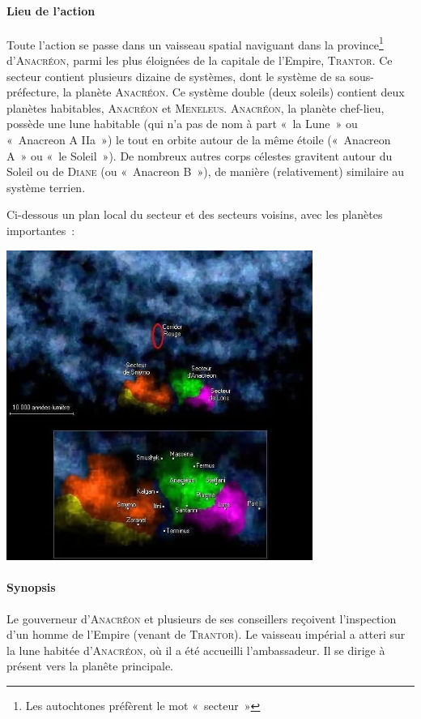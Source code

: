\paragraph{Lieu de l’action}
{
Toute l’action se passe dans un vaisseau spatial naviguant dans la province\footnote{Les autochtones préfèrent le mot «~secteur~»} d’\textsc{Anacréon}, parmi les plus éloignées de la capitale de l’Empire, \textsc{Trantor}.
Ce secteur contient plusieurs dizaine de systèmes, dont le système de sa sous-préfecture, la planète \textsc{Anacréon}.
Ce système double (deux soleils) contient deux planètes habitables, \textsc{Anacréon} et \textsc{Meneleus}.  \textsc{Anacréon}, la planète chef-lieu, possède une lune habitable (qui n’a pas de nom à part «~la Lune~» ou «~Anacreon A IIa~») le tout en orbite autour de la même étoile («~Anacreon A~» ou «~le Soleil~»).
De nombreux autres corps célestes gravitent autour du Soleil ou de \textsc{Diane} (ou «~Anacreon B~»), de manière (relativement) similaire au système terrien.

Ci-dessous un plan local du secteur et des secteurs voisins, avec les planètes importantes~:
\begin{center}
	\includegraphics[width=10cm]{galactographie.png}
\end{center}
}

\paragraph{Synopsis}
{
Le gouverneur d’\textsc{Anacréon} et plusieurs de ses conseillers reçoivent l’inspection d’un homme de l’Empire (venant de \textsc{Trantor}).
Le vaisseau impérial a atteri sur la lune habitée d’\textsc{Anacréon}, où il a été accueilli l’ambassadeur.  Il se dirige à présent vers la planête principale.
}

